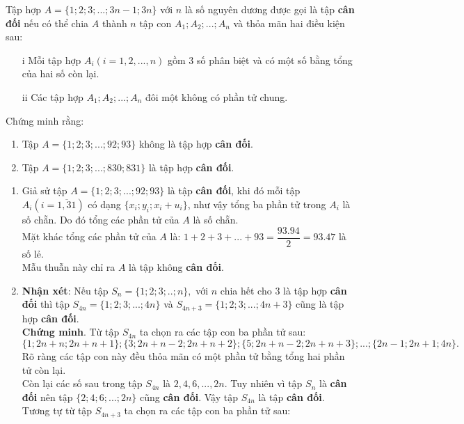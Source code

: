 \begin{ex}%
Tập hợp $A=\{1;2;3;...;3n-1;3n\}$ với $n$ là số nguyên dương được gọi là tập \textbf{cân đối} nếu có thể chia $A$ thành $n$ tập con $A_1;A_2;...;A_n$ và thỏa mãn hai điều kiện sau:
\begin{enumerate}
	\item[i] Mỗi tập hợp $A_i(i=1,2,...,n)$ gồm 3 số phân biệt và có một số bằng tổng của hai số còn lại.
	\item[ii] Các tập hợp $A_1;A_2;...;A_n$ đôi một không có phần tử chung.	
\end{enumerate}
Chứng minh rằng:
\begin{enumerate}
	\item Tập $A=\{1;2;3;...;92;93\} $ không là tập hợp \textbf{cân đối}.
	\item Tập $A=\{1;2;3;...;830;831\}$ là tập hợp \textbf{cân đối}.
\end{enumerate}
\loigiai
   {\begin{enumerate}
   		\item Giả sử tập $A=\{1;2;3;...;92;93\} $ là tập \textbf{cân đối}, khi đó mỗi tập $A_i(i=\overline{1,31})$ có dạng $\{x_i;y_i;x_i+u_i\}$, như vậy tổng ba phần tử trong $A_i$ là số chẵn. Do đó tổng các phần tử của $A$ là số chẵn.\\
   		Mặt khác tổng các phần tử của $A$ là: $1+2+3+...+93=\dfrac{93.94}{2}=93.47$ là số lẻ.\\
   		Mẫu thuẫn này chỉ ra $A$ là tập không \textbf{cân đối}.
   		\item \textbf{Nhận xét}: Nếu tập $S_n=\{1;2;3;..;n\},$ với $n$ chia hết cho $3$ là tập hợp \textbf{cân đối} thì tập $S_{4n}=\{1;2;3;...;4n\}$ và $S_{4n+3}=\{1;2;3;...;4n+3\}$ cũng là tập hợp \textbf{cân đối}.\\
   	\textbf{	Chứng minh}. Từ tập $S_{4n}$ ta chọn ra các tập con ba phần tử sau:\\
   	$\{1;2n+n;2n+n+1\};\{3;2n+n-2;2n+n+2\};\{5;2n+n-2;2n+n+3\};...;\{2n-1;2n+1;4n\}.$\\
   	Rõ ràng các tập con này đều thỏa mãn có một phần tử bằng tổng hai phần tử còn lại.\\
   	Còn lại các số sau trong tập $S_{4n}$ là $2,4,6,...,2n$. Tuy nhiên vì tập $S_{n}$ là \textbf{cân đối} nên tập $\{2;4;6;...;2n\}$ cũng \textbf{cân đối}. Vậy tập $S_{4n}$ là tập \textbf{cân đối}.\\
   	Tương tự từ tập $S_{4n+3}$ ta chọn ra các tập con ba phần tử sau:
   	\begin{center}

\end{center}
\end{enumerate}}
\end{ex}
